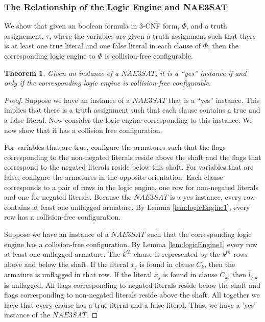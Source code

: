\documentclass[10pt]{CSUNthesis}
\theoremstyle{plain}%
\newtheorem{thm}{Theorem}
\theoremstyle{definition}
\theoremstyle{remark}
\begin{document}
\subsubsection{The Relationship of the Logic Engine and NAE3SAT}

We show that given an boolean formula in 3-CNF form, $\Phi$, and a truth assignement, $\tau$, where the variables are given a truth assignment such that there is at least one true literal and one false literal in each clause of $\Phi$, then the corresponding logic engine to $\Phi$ is collision-free configurable.
\begin{thm}\label{thm:LogicEngineV3-1}
 Given an instance of a $NAE3SAT$,  it is a ``yes'' instance if and only if the corresponding logic 
engine is collision-free configurable.
\end{thm}
\begin{proof}
Suppose we have an instance of a $NAE3SAT$ that is a ``yes'' instance. This implies that there is a 
truth assignment such that each clause contains a true and a false literal. Now consider the logic 
engine corresponding to this instance. We now 
show that it has a collision free configuration.

For variables that are true, configure the armatures such that the flags corresponding to the 
non-negated literals reside above the 
shaft and the flags that correspond to the negated literals reside below this shaft.  For variables 
that are false, configure the 
armatures in the opposite orientation.  Each clause corresponds to a pair of rows in 
the logic engine, one row for non-negated literals and one for negated literals.  Because the 
$NAE3SAT$ is a yes instance, every row contains at least one unflagged armature.  
By Lemma \ref{lem:logicEngine1}, every row  has a collision-free configuration.

Suppose we have an instance of a $NAE3SAT$ such that the corresponding logic engine has a 
collision-free configuration. By Lemma \ref{lem:logicEngine1} every row at least one unflagged 
armature.  The $k^{th}$ clause is represented by the $k^{th}$ rows above and below the shaft. If the 
literal $x_j$ is found in clause $C_k$, then the armature is unflagged in that row. If the literal 
$\bar{x}_j$ is found in clause $C_k$, then $\bar{l}_{j,k}$ is unflagged.  All flags 
corresponding to negated literals reside below the shaft and flags corresponding to non-negated 
literals reside above the shaft.  All together we have that every clause has a true literal and a 
false literal.  Thus, we have a 'yes' instance of the $NAE3SAT$.
\end{proof}
\end{document}
